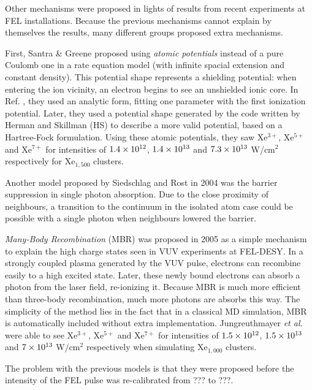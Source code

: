 Other mechanisms were proposed in lights of results from recent experiments at
FEL installations. Because the previous mechanisms cannot explain by themselves
the results, many different groups proposed extra mechanisms.


First, Santra \& Greene proposed using \textit{atomic potentials} instead of a
pure Coulomb one in a rate equation model (with infinite spacial extension and
constant density). This potential shape represents a shielding potential: when
entering the ion vicinity, an electron begins to see an unshielded ionic core.
In Ref. \cite{Greene2003}, they used an analytic form, fitting one parameter
with the first ionization potential. Later\cite{Walters2006}, they used a
potential shape generated by the code written by Herman and
Skillman\cite{HS1963} (HS) to describe a more valid potential, based on a
Hartree-Fock formulation. Using these atomic potentials, they saw Xe$^{3+}$,
Xe$^{5+}$ and Xe$^{7+}$ for intensities of $\ten{1.4}{12}$, $\ten{1.4}{13}$ and
$\ten{7.3}{13}$ W/cm$^2$ respectively for Xe$_{1,500}$ clusters.

Another model proposed by Siedschlag and Rost\cite{Siedschlag2004} in 2004 was
the barrier suppression in single photon absorption. Due to the close proximity
of neighbours, a transition to the continuum in the isolated atom case could be
possible with a single photon when neighbours lowered the barrier. 

\textit{Many-Body Recombination} (MBR) was proposed in 2005
as a simple mechanism to explain the high charge states seen in VUV
experiments at FEL-DESY\cite{Jungreuthmayer2005}. In a strongly coupled plasma
generated by the VUV pulse, electrons can recombine easily to a high excited
state. Later, these newly bound electrons can absorb a photon from the laser
field, re-ionizing it. Because MBR is much more efficient than three-body
recombination, much more photons are absorbs this way. The simplicity of the
method lies in the fact that in a classical MD simulation, MBR is automatically
included without extra implementation. Jungreuthmayer \textit{et al.} were able
to see Xe$^{3+}$, Xe$^{5+}$ and Xe$^{7+}$ for intensities of $\ten{1.5}{12}$,
$\ten{1.5}{13}$ and $\ten{7}{13}$ W/cm$^2$ respectively when simulating
Xe$_{1,000}$ clusters.


The problem with the previous models is that they were proposed before the
intensity of the FEL pulse was re-calibrated from ??? to ???.


